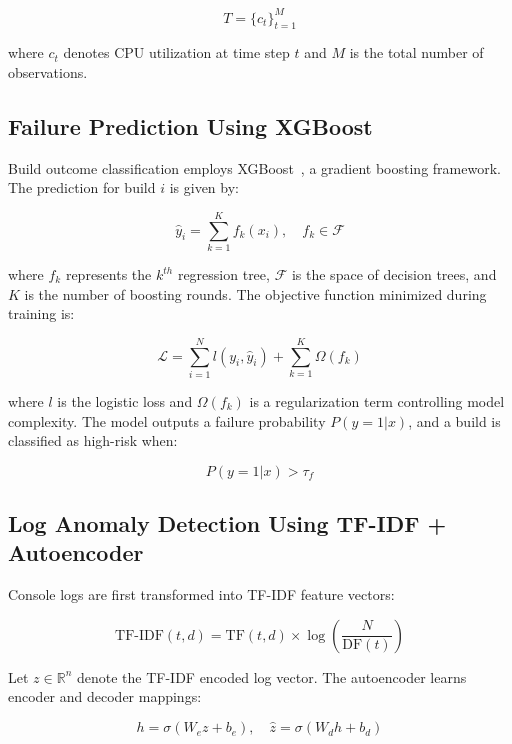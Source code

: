 \documentclass[conference]{IEEEtran}
\begin{document}
\begin{equation}
T = \{c_t\}_{t=1}^{M}
\end{equation}

where $c_t$ denotes CPU utilization at time step $t$ and $M$ is the total number of observations.

\subsection{Failure Prediction Using XGBoost}

Build outcome classification employs XGBoost~\cite{chen2016xgboost}, a gradient boosting framework. The prediction for build $i$ is given by:

\begin{equation}
\hat{y}_i = \sum_{k=1}^{K} f_k(x_i), \quad f_k \in \mathcal{F}
\end{equation}

where $f_k$ represents the $k^{th}$ regression tree, $\mathcal{F}$ is the space of decision trees, and $K$ is the number of boosting rounds. The objective function minimized during training is:

\begin{equation}
\mathcal{L} = \sum_{i=1}^{N} l(y_i, \hat{y}_i) + \sum_{k=1}^{K} \Omega(f_k)
\end{equation}

where $l$ is the logistic loss and $\Omega(f_k)$ is a regularization term controlling model complexity. The model outputs a failure probability $P(y=1|x)$, and a build is classified as high-risk when:

\begin{equation}
P(y=1|x) > \tau_f
\end{equation}

\subsection{Log Anomaly Detection Using TF-IDF + Autoencoder}

Console logs are first transformed into TF-IDF feature vectors:

\begin{equation}
\text{TF-IDF}(t,d) = \text{TF}(t,d) \times \log \left(\frac{N}{\text{DF}(t)}\right)
\end{equation}

Let $z \in \mathbb{R}^n$ denote the TF-IDF encoded log vector. The autoencoder learns encoder and decoder mappings:

\begin{equation}
h = \sigma(W_e z + b_e), \quad \hat{z} = \sigma(W_d h + b_d)
\end{equation}
\end{document}
